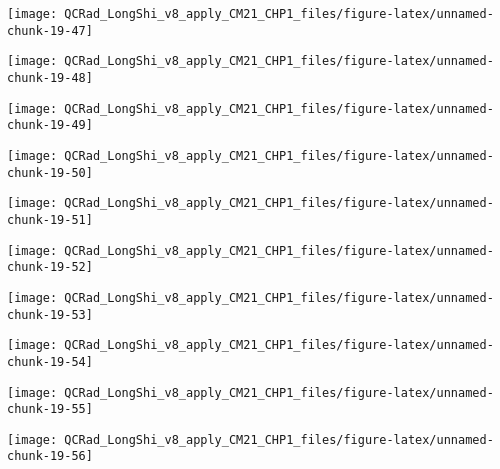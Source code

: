 \documentclass[
  10pt,
  a4paper,oneside]{article}
\begin{document}
\begin{center}\texttt{[image: QCRad\_LongShi\_v8\_apply\_CM21\_CHP1\_files/figure-latex/unnamed-chunk-19-47]} \end{center}

\begin{center}\texttt{[image: QCRad\_LongShi\_v8\_apply\_CM21\_CHP1\_files/figure-latex/unnamed-chunk-19-48]} \end{center}

\begin{center}\texttt{[image: QCRad\_LongShi\_v8\_apply\_CM21\_CHP1\_files/figure-latex/unnamed-chunk-19-49]} \end{center}

\begin{center}\texttt{[image: QCRad\_LongShi\_v8\_apply\_CM21\_CHP1\_files/figure-latex/unnamed-chunk-19-50]} \end{center}

\begin{center}\texttt{[image: QCRad\_LongShi\_v8\_apply\_CM21\_CHP1\_files/figure-latex/unnamed-chunk-19-51]} \end{center}

\begin{center}\texttt{[image: QCRad\_LongShi\_v8\_apply\_CM21\_CHP1\_files/figure-latex/unnamed-chunk-19-52]} \end{center}

\begin{center}\texttt{[image: QCRad\_LongShi\_v8\_apply\_CM21\_CHP1\_files/figure-latex/unnamed-chunk-19-53]} \end{center}

\begin{center}\texttt{[image: QCRad\_LongShi\_v8\_apply\_CM21\_CHP1\_files/figure-latex/unnamed-chunk-19-54]} \end{center}

\begin{center}\texttt{[image: QCRad\_LongShi\_v8\_apply\_CM21\_CHP1\_files/figure-latex/unnamed-chunk-19-55]} \end{center}

\begin{center}\texttt{[image: QCRad\_LongShi\_v8\_apply\_CM21\_CHP1\_files/figure-latex/unnamed-chunk-19-56]} \end{center}
\end{document}
